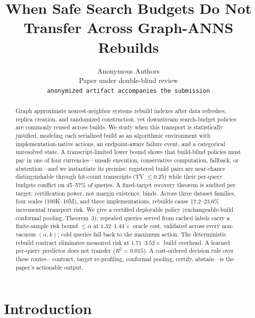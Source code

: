 \documentclass{article}
\title{When Safe Search Budgets Do Not Transfer Across Graph-ANNS Rebuilds}
\author{Anonymous Authors\\
Paper under double-blind review\\
\texttt{anonymized artifact accompanies the submission}}
\begin{document}
\maketitle

\begin{abstract}
Graph approximate nearest-neighbor systems rebuild indexes after data refreshes, replica creation, and
randomized construction, yet downstream search-budget policies are commonly reused across builds. We
study when this transport is statistically justified, modeling each serialized build as an algorithmic
environment with implementation-native actions, an endpoint-aware failure event, and a categorical
unresolved state. A transcript-limited lower bound shows that build-blind policies must pay in one of
four currencies---unsafe execution, conservative computation, fallback, or abstention---and we
instantiate its premise: registered build pairs are near-chance distinguishable through hit-count
transcripts (TV $\le0.25$) while their per-query budgets conflict on 45--57\% of queries. A
fixed-target recovery theorem is audited per target: certification power, not margin existence, binds.
Across three dataset families, four scales (100K--10M), and three implementations, rebuilds cause
17.2--23.6\% incremental transport risk. We give a certified deployable policy (exchangeable-build
conformal pooling, Theorem~3): repeated queries served from cached labels carry a finite-sample risk
bound $\le\alpha$ at $1.32$--$1.44\times$ oracle cost, validated across every non-vacuous
$(\alpha,k)$; cold queries fall back to the maximum action. The deterministic rebuild contract
eliminates measured risk at $1.71$--$3.52\times$ build overhead. A learned per-query predictor does not
transfer ($R^2{=}0.015$). A cost-ordered decision rule over these
routes---contract, target re-profiling, conformal pooling, certify, abstain---is the paper's
actionable output.
\end{abstract}

\section{Introduction}
\label{sec:intro}
\end{document}
